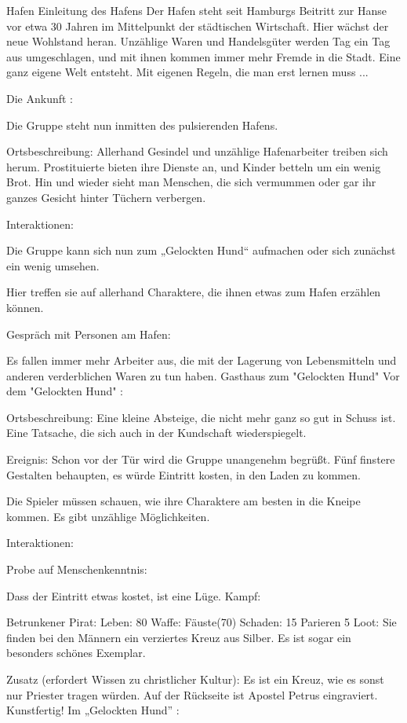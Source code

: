 
Hafen
Einleitung des Hafens
Der Hafen steht seit Hamburgs Beitritt zur Hanse vor etwa 30 Jahren im Mittelpunkt der städtischen Wirtschaft. Hier wächst der neue Wohlstand heran. Unzählige Waren und Handelsgüter werden Tag ein Tag aus umgeschlagen, und mit ihnen kommen immer mehr Fremde in die Stadt. Eine ganz eigene Welt entsteht. Mit eigenen Regeln, die man erst lernen muss ...

Die Ankunft
:

Die Gruppe steht nun inmitten des pulsierenden Hafens.

Ortsbeschreibung: Allerhand Gesindel und unzählige Hafenarbeiter treiben sich herum. Prostituierte bieten ihre Dienste an, und Kinder betteln um ein wenig Brot. Hin und wieder sieht man Menschen, die sich vermummen oder gar ihr ganzes Gesicht hinter Tüchern verbergen.

Interaktionen:

Die Gruppe kann sich nun zum „Gelockten Hund“ aufmachen oder sich zunächst ein wenig umsehen.

Hier treffen sie auf allerhand Charaktere, die ihnen etwas zum Hafen erzählen können.

Gespräch mit Personen am Hafen:

Es fallen immer mehr Arbeiter aus, die mit der Lagerung von Lebensmitteln und anderen verderblichen Waren zu tun haben.
Gasthaus zum "Gelockten Hund"
Vor dem "Gelockten Hund"
:

Ortsbeschreibung: Eine kleine Absteige, die nicht mehr ganz so gut in Schuss ist. Eine Tatsache, die sich auch in der Kundschaft wiederspiegelt.

Ereignis: Schon vor der Tür wird die Gruppe unangenehm begrüßt. Fünf finstere Gestalten behaupten, es würde Eintritt kosten, in den Laden zu kommen.

Die Spieler müssen schauen, wie ihre Charaktere am besten in die Kneipe kommen. Es gibt unzählige Möglichkeiten.


Interaktionen:

Probe auf Menschenkenntnis:

Dass der Eintritt etwas kostet, ist eine Lüge.
Kampf:

Betrunkener Pirat:
Leben: 80
Waffe: Fäuste(70)
Schaden: 15
Parieren 5
Loot:
Sie finden bei den Männern ein verziertes Kreuz aus Silber. Es ist sogar ein besonders schönes Exemplar.

Zusatz (erfordert Wissen zu christlicher Kultur):
Es ist ein Kreuz, wie es sonst nur Priester tragen würden.
Auf der Rückseite ist Apostel Petrus eingraviert. Kunstfertig!
Im „Gelockten Hund”
:

